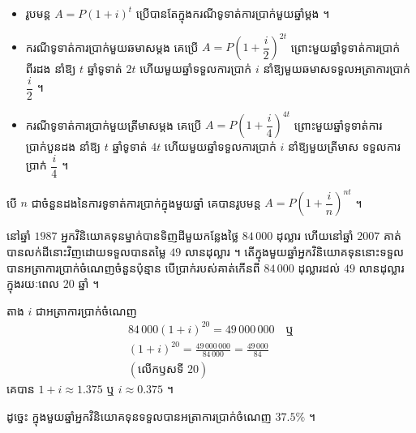 \begin{note}[សម្គាល់]
\begin{itemize}
  \item រូបមន្ត $A = P(1 + i)^t$ ប្រើបានតែក្នុងករណីទូទាត់ការប្រាក់មួយឆ្នាំម្តង ។
  \item ករណីទូទាត់ការប្រាក់មួយឆមាសម្តង គេប្រើ $A = P\left(1 + \dfrac{i}{2}\right)^{2t}$ ព្រោះមួយឆ្នាំទូទាត់ការប្រាក់ពីរដង នាំឱ្យ $t$ ឆ្នាំទូទាត់ $2t$ ហើយមួយឆ្នាំទទួលការប្រាក់ $i$ នាំឱ្យមួយឆមាសទទួលអត្រាការប្រាក់ $\dfrac{i}{2}$ ។
  \item ករណីទូទាត់ការប្រាក់មួយត្រីមាសម្តង គេប្រើ $A = P\left(1 + \dfrac{i}{4}\right)^{4t}$ ព្រោះមួយឆ្នាំទូទាត់ការប្រាក់បួនដង នាំឱ្យ $t$ ឆ្នាំទូទាត់ $4t$ ហើយមួយឆ្នាំទទួលការប្រាក់ $i$ នាំឱ្យមួយត្រីមាស ទទួលការប្រាក់ $\dfrac{i}{4}$ ។
\end{itemize}
\end{note}

\begin{formulaBox}[ជាទូទៅ]
បើ $n$ ជាចំនួនដងនៃការទូទាត់ការប្រាក់ក្នុងមួយឆ្នាំ គេបានរូបមន្ត $A = P\left(1 + \dfrac{i}{n}\right)^{nt}$ ។
\end{formulaBox}

\begin{example}[លំហាត់គំរូ ៤]
នៅឆ្នាំ $1987$ អ្នកវិនិយោគទុនម្នាក់បានទិញដីមួយកន្លែងថ្លៃ $84\,000$ ដុល្លារ ហើយនៅឆ្នាំ $2007$ គាត់បានលក់ដីនោះវិញដោយទទួលបានតម្លៃ $49$ លានដុល្លារ ។ តើក្នុងមួយឆ្នាំអ្នកវិនិយោគទុននោះទទួលបានអត្រាការប្រាក់ចំណេញចំនួនប៉ុន្មាន បើប្រាក់របស់គាត់កើនពី $84\,000$ ដុល្លារដល់ $49$ លានដុល្លារក្នុងរយៈពេល $20$ ឆ្នាំ ។
\end{example}
\ans
តាង $i$ ជាអត្រាការប្រាក់ចំណេញ
\[
\begin{gathered}
84\,000(1 + i)^{20} = 49\,000\,000 \quad \text{ឬ}\\
(1 + i)^{20} = \frac{49\,000\,000}{84\,000} = \frac{49\,000}{84}\\
(\text{លើកឫសទី } 20)
\end{gathered}
\]
គេបាន $1 + i \approx 1.375$ ឬ $i \approx 0.375$ ។

ដូច្នេះ ក្នុងមួយឆ្នាំអ្នកវិនិយោគទុនទទួលបានអត្រាការប្រាក់ចំណេញ $37.5\%$ ។

